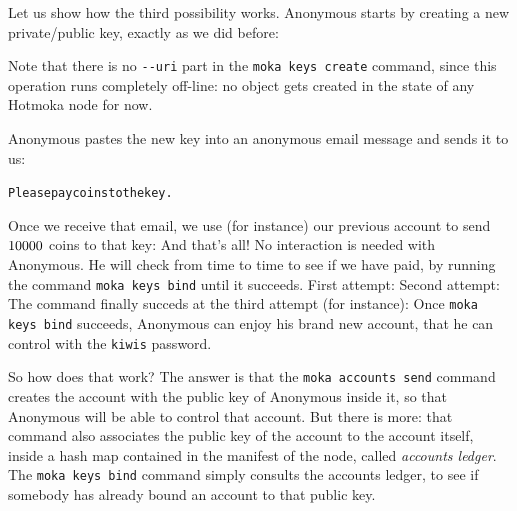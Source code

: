 Let us show how the third possibility works. Anonymous starts by creating a new private/public key,
exactly as we did before:
%
%
\begin{commentbox}
  Note that there is no \texttt{-{}-uri} part in the \texttt{moka keys create} command,
  since this operation
  runs completely off-line: no object gets created in the state of any Hotmoka node for now.
\end{commentbox}
%
Anonymous pastes the new key into an anonymous email message and sends it to us:
%
\begin{center}
  {\small\begin{alltt}
    Please pay \sentToAnonymous{} coins to the key \publicKeyBaseFifthyeightAnonymous{}.    
  \end{alltt}}
\end{center}
%
Once we receive that email, we use (for instance) our previous account
to send $10000{}$ coins to that key:
%
%
And that's all! No interaction is needed with Anonymous. He will check
from time to time to see if we have paid, by running the command \texttt{moka keys bind}
until it succeeds. First attempt:
%
%
Second attempt:
%
%
The command finally succeds at the third attempt (for instance):
%
%
Once \texttt{moka keys bind} succeeds, Anonymous can enjoy his brand new account, that he
can control with the \texttt{kiwis} password.

So how does that work? The answer is that the \texttt{moka accounts send} command
creates the account \texttt{\accountAnonymous{}} with the public key of
Anonymous inside it, so that Anonymous will be able to control that account.
But there is more: that command
also associates the public key of the account to the account itself,
inside a hash map contained in the manifest of the node,
called \emph{accounts ledger}.
The \texttt{moka keys bind} command simply consults the
accounts ledger, to see if somebody has already bound an account to that public key.

